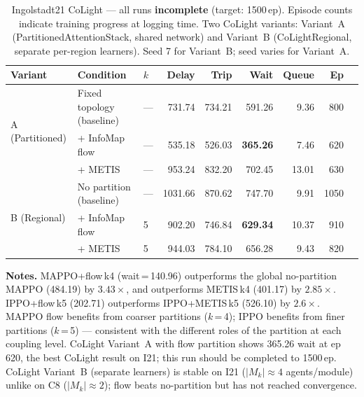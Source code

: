 \documentclass{article}
\begin{document}
\begin{table}[H]
    \centering
    \caption{Ingolstadt21 CoLight --- all runs \textbf{incomplete} (target:
        1500\,ep). Episode counts indicate training progress at logging time.
        Two CoLight variants: Variant~A (PartitionedAttentionStack, shared
        network) and Variant~B (CoLightRegional, separate per-region learners).
        Seed 7 for Variant~B; seed varies for Variant~A.}
    \label{tab:i21_colight}
    \small
    \begin{tabular}{lllrrrrrr}
        \toprule
        Variant & Condition                 & $k$ & Delay   & Trip   & Wait            & Queue & Ep   \\
        \midrule
        \multirow{3}{*}{A (Partitioned)}
                & Fixed topology (baseline) & --- & 731.74  & 734.21 & 591.26          & 9.36  & 800  \\
                & + InfoMap flow            & --- & 535.18  & 526.03 & \textbf{365.26} & 7.46  & 620  \\
                & + METIS                   & --- & 953.24  & 832.20 & 702.45          & 13.01 & 630  \\
        \midrule
        \multirow{3}{*}{B (Regional)}
                & No partition (baseline)   & --- & 1031.66 & 870.62 & 747.70          & 9.91  & 1050 \\
                & + InfoMap flow            & 5   & 902.20  & 746.84 & \textbf{629.34} & 10.37 & 910  \\
                & + METIS                   & 5   & 944.03  & 784.10 & 656.28          & 9.43  & 820  \\
        \bottomrule
    \end{tabular}
\end{table}

\noindent\textbf{Notes.}
MAPPO+flow\,k4 (wait\,=\,140.96) outperforms the global no-partition MAPPO
(484.19) by $3.43\times$, and outperforms METIS\,k4 (401.17) by $2.85\times$.
IPPO+flow\,k5 (202.71) outperforms IPPO+METIS\,k5 (526.10) by $2.6\times$.
MAPPO flow benefits from coarser partitions ($k$\,=\,4); IPPO benefits from
finer partitions ($k$\,=\,5) --- consistent with the different roles of the
partition at each coupling level.
CoLight Variant~A with flow partition shows 365.26 wait at ep\,620, the
best CoLight result on I21; this run should be completed to 1500\,ep.
CoLight Variant~B (separate learners) is stable on I21 ($|M_k| \approx 4$
agents/module) unlike on C8 ($|M_k| \approx 2$); flow beats no-partition but
has not reached convergence.
\end{document}
